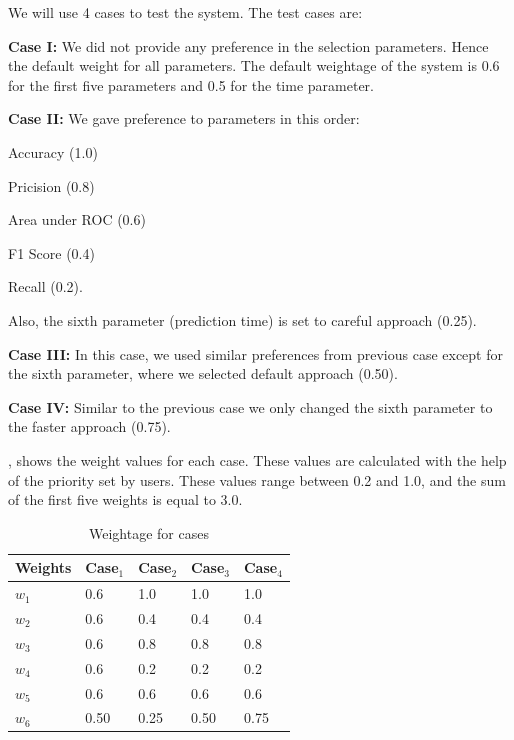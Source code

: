 \documentclass[a4paper,fleqn]{cas-dc}
\begin{document}
We will use 4 cases to test the system. The test cases are:

\noindent
{\bfseries Case I:} We did not provide any preference in the selection parameters. Hence the default weight for all parameters. The default weightage of the system is 0.6 for the first five parameters and 0.5 for the time parameter.

\vspace*{0.5em}
\noindent
{\bfseries Case II:} We gave preference to parameters in this order:
\begin{enumerate*}[label=\arabic{*}.]
    \item Accuracy (1.0)
    \item Pricision (0.8)
    \item Area under ROC (0.6)
    \item F1 Score (0.4)
    \item Recall (0.2).
\end{enumerate*}

\noindent
Also, the sixth parameter (prediction time) is set to careful approach (0.25).

\vspace*{0.5em}
\noindent
{\bfseries Case III:} In this case, we used similar preferences from previous case except for the sixth parameter, where we selected default approach (0.50).

\vspace*{0.5em}
\noindent
{\bfseries Case IV:} Similar to the previous case we only changed the sixth parameter to the faster approach (0.75).

\vspace*{0.5em}
, shows the weight values for each case. These values are calculated with the help of the priority set by users. These values range between 0.2 and 1.0, and the sum of the first five weights is equal to 3.0.

\begin{table}[h]
    \caption{Weightage for cases}\label{tab:wieghtage_for_cases}
    \begin{tabular*}{\tblwidth}{@{}LLLLL@{}}
        \toprule
        Weights & Case$_1$ & Case$_2$ & Case$_3$ & Case$_4$ \\
        \midrule
        $w_1$ & 0.6 & 1.0 & 1.0 & 1.0 \\
        $w_2$ & 0.6 & 0.4 & 0.4 & 0.4 \\
        $w_3$ & 0.6 & 0.8 & 0.8 & 0.8 \\
        $w_4$ & 0.6 & 0.2 & 0.2 & 0.2 \\
        $w_5$ & 0.6 & 0.6 & 0.6 & 0.6 \\
        $w_6$ & 0.50 & 0.25 & 0.50 & 0.75 \\
        \bottomrule
    \end{tabular*}
\end{table}
\end{document}
